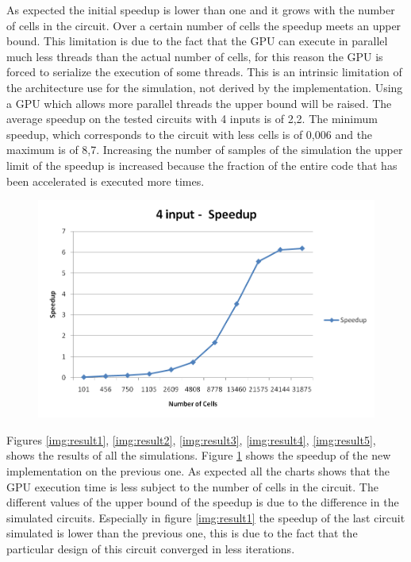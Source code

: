 As expected the initial speedup is lower than one and it grows with the number of cells in the circuit. Over a certain number of cells the speedup meets an upper bound. This limitation is due to the fact that the GPU can execute in parallel much less threads than the actual number of cells, for this reason the GPU is forced to serialize the execution of some threads. This is an intrinsic limitation of the architecture use for the simulation, not derived by the implementation. Using a GPU which allows more parallel threads the upper bound will be raised. The average speedup on the tested circuits with 4 inputs is of 2,2. The minimum speedup, which corresponds to the circuit with less cells is of 0,006 and the maximum is of 8,7. Increasing the number of samples of the simulation the upper limit of the speedup is increased because the fraction of the entire code that has been accelerated is executed more times.

\begin{figure}
\centering
\includegraphics[scale=0.6]{img/speed.png}
\label{img:speed}
\end{figure}

Figures \ref{img:result1}, \ref{img:result2}, \ref{img:result3}, \ref{img:result4}, \ref{img:result5}, shows the results of all the simulations. Figure \ref{img:speed} shows the speedup of the new implementation on the previous one. As expected all the charts shows that the GPU execution time is less subject to the number of cells in the circuit. The different values of the upper bound of the speedup is due to the difference in the simulated circuits. Especially in figure \ref{img:result1} the speedup of the last circuit simulated is lower than the previous one, this is due to the fact that the particular design of this circuit converged in less iterations.